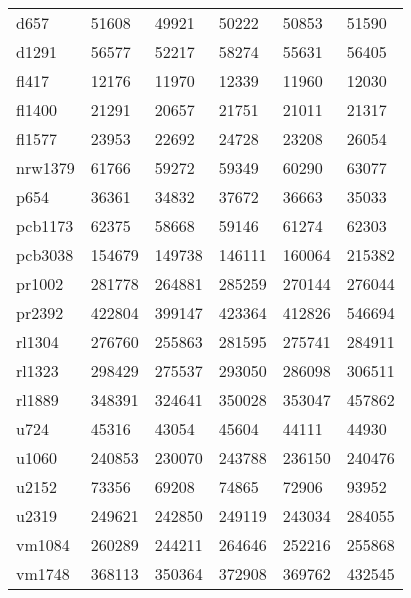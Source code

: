 \begin{center}
\begin{longtable}{llllll}
			d657	 &	51608    & 49921	& 50222	& 50853	& 51590 \\
			d1291 &	56577    & 52217	& 58274	& 55631	& 56405 \\
			fl417 &	12176    & 11970	& 12339	& 11960	& 12030 \\
			fl1400 &	 21291   & 20657	& 21751	& 21011	& 21317 \\
			fl1577 & 23953   & 22692	& 24728	& 23208	& 26054 \\
			nrw1379 & 61766  & 59272	& 59349	& 60290	& 63077 \\
			p654    & 36361  & 34832	& 37672	& 36663	& 35033 \\
			pcb1173 & 62375  & 58668	& 59146	& 61274	& 62303 \\
			pcb3038 & 154679 & 149738 & 146111 & 160064 & 215382 \\
			pr1002	& 281778 & 264881 & 285259 & 270144 & 276044 \\
			pr2392	& 422804 & 399147 & 423364 & 412826 & 546694 \\
			rl1304	& 276760 & 255863 & 281595 & 275741 & 284911 \\
			rl1323	& 298429 & 275537 & 293050 & 286098 & 306511 \\
			rl1889	& 348391 & 324641 & 350028 & 353047 & 457862 \\
			u724		& 45316  & 43054  & 45604 & 44111 & 44930 \\
			u1060	& 240853 & 230070 & 243788 & 236150 & 240476 \\
			u2152  	& 73356	& 69208	& 74865 & 72906 & 93952 \\
			u2319 	& 249621	 & 242850 & 249119 & 243034 & 284055 \\
			vm1084 	& 260289	 & 244211 & 264646 & 252216 & 255868 \\
			vm1748	& 368113	 & 350364 & 372908 & 369762 & 432545 \\

\end{longtable}
\end{center}